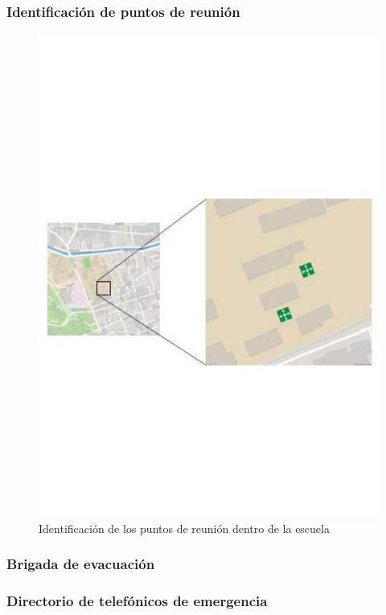     \subsubsection{Identificación de puntos de reunión}
    \begin{figure}[H]
        \centering
        \includegraphics[scale=0.25]{30/img/puntoDeReunion.pdf}
        \caption{Identificación de los puntos de reunión dentro de la escuela}
    \end{figure}
    
    \subsubsection{Brigada de evacuación}
    
    
    \subsubsection{Directorio de telefónicos de emergencia}
    
